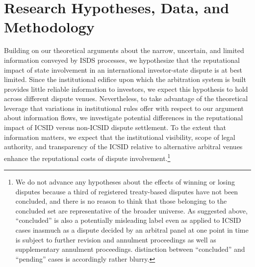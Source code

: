 \documentclass[12pt,onesided]{amsart}
\begin{document}

\section*{Research Hypotheses, Data, and Methodology}

Building on our theoretical arguments about the narrow, uncertain, and limited information conveyed by ISDS processes, we hypothesize that the reputational impact of state involvement in an international investor-state dispute is at best limited. Since the institutional edifice upon which the arbitration system is built provides little reliable information to investors, we expect this hypothesis to hold across different dispute venues. Nevertheless, to take advantage of the theoretical leverage that variations in institutional rules offer with respect to our argument about information flows, we investigate potential differences in the reputational impact of  ICSID versus non-ICSID dispute settlement. To the extent that information matters, we expect that the institutional visibility, scope of legal authority, and transparency of the ICSID relative to alternative arbitral venues enhance the reputational costs of dispute involvement.\footnote{We do not advance any hypotheses about the effects of winning or losing disputes because a third of registered treaty-based disputes have not been concluded, and there is no reason to think that those belonging to the concluded set are representative of the broader universe. As suggested above, ``concluded'' is also a potentially misleading label even as applied to ICSID cases inasmuch as a dispute decided by an arbitral panel at one point in time is subject to further revision and annulment proceedings as well as supplementary annulment proceedings. distinction between ``concluded'' and ``pending'' cases is accordingly rather blurry.}
\end{document}
